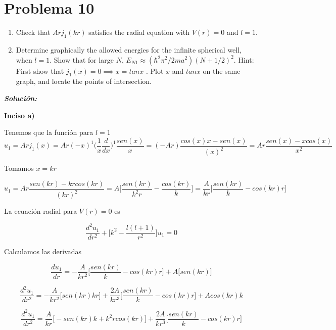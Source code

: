 \documentclass[10pt]{article}
\begin{document}
\medskip

\section{Problema 10}

\medskip
\begin{tcolorbox}[colback=gray!10, colframe=black, title=Problem 10]

\begin{enumerate}[label=\alph*)]
    \item Check that $Arj_{1}(kr)$ satisfies the radial equation with $V(r)=0$ and $l=1$.
    \item Determine graphically the allowed energies for the infinite spherical well,
when $l=1$. Show that for large $N$, $E_{N1}\approx (\hbar^{2}\pi^{2}/2ma^{2})(N+1/2)^{2}$.
Hint: First show that $j_{1}(x)=0 \implies x = tanx$ . Plot $x$ and $tanx$ on  the
same graph, and locate the points of intersection.


\end{enumerate}


\end{tcolorbox}
\medskip


\Large{\textit{\textbf{Solución:}}}

\medskip


\textbf{Inciso a)}


Tenemos que la función para $l=1$
$$u_{1}=Arj_{1}(x)=Ar(-x)^{1}\bigg(\frac{1}{x}\frac{d}{dx} \bigg)^{1}\frac{sen(x)}{x}=(-Ar)\frac{cos(x)x-sen(x)}{(x)^{2}}=Ar\frac{sen(x)-xcos(x)}{x^{2}}$$

Tomamos $x=kr$

$$u_{1}=Ar\frac{sen(kr)-krcos(kr)}{(kr)^{2}}=A\bigg[ \frac{sen(kr)}{k^{2}r}-\frac{cos(kr)}{k}\bigg]=\frac{A}{kr}\bigg[ \frac{sen(kr)}{k}-cos(kr)r\bigg]$$
\medskip

La ecuación radial para $V(r)=0$ es 

$$\frac{d^{2}u_{1}}{dr^{2}}+\bigg[ k^{2}-\frac{l(l+1)}{r^{2}} \bigg]u_{1}=0$$

Calculamos las derivadas 

$$\frac{du_{1}}{dr}=-\frac{A}{kr^{2}}\bigg[ \frac{sen(kr)}{k}-cos(kr)r\bigg]+A\bigg[sen(kr)\bigg]$$

$$\frac{d^{2}u_{1}}{dr^{2}}=-\frac{A}{kr^{2}}\bigg[sen(kr)kr\bigg]+ \frac{2A}{kr^{3}}\bigg[ \frac{sen(kr)}{k}-cos(kr)r\bigg]+Acos(kr)k$$


$$\frac{d^{2}u_{1}}{dr^{2}}=\frac{A}{kr}\bigg[-sen(kr)k+k^{2}rcos(kr)\bigg]+ \frac{2A}{kr^{3}}\bigg[ \frac{sen(kr)}{k}-cos(kr)r\bigg]$$
\end{document}
